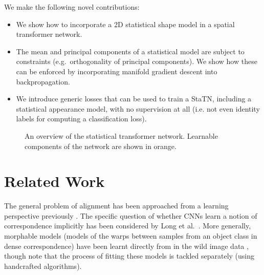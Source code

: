 \documentclass[runningheads]{llncs}
\newcommand{\etal}{{et al.~}}
\begin{document}
We make the following novel contributions:
\begin{itemize}
    \item We show how to incorporate a 2D statistical shape model in a spatial transformer network.
    \item The mean and principal components of a statistical model are subject to constraints (e.g.~orthogonality of principal components). We show how these can be enforced by incorporating manifold gradient descent into backpropagation.
    \item We introduce generic losses that can be used to train a StaTN, including a statistical appearance model, with no supervision at all (i.e. not even identity labels for computing a classification loss).
\end{itemize}


\begin{figure}[t]
\noindent{}
\caption{An overview of the statistical transformer network. Learnable components of the network are shown in orange. }
\label{fig:example}
\end{figure}

\section{Related Work}

The general problem of alignment has been approached from a learning perspective previously \cite{huang2012learning}. The specific question of whether CNNs learn a notion of correspondence implicitly has been considered by Long \etal \cite{long2014convnets}. More generally, morphable models (models of the warps between samples from an object class in dense correspondence) have been learnt directly from in the wild image data \cite{cashman2013shape,antonakos2014automatic}, though note that the process of fitting these models is tackled separately (using handcrafted algorithms).

\end{document}
